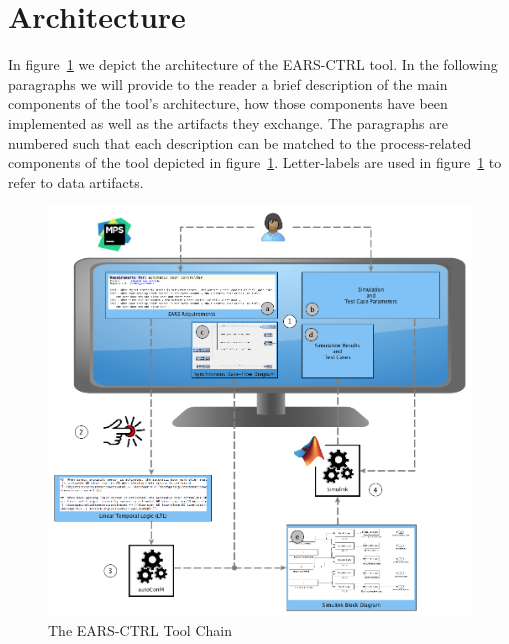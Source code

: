 \section{Architecture}
\vspace{-.3cm}In figure~\ref{fig:ears_ctrl_toolchain} we depict the architecture
of the \textsf{EARS-CTRL} tool. In the following paragraphs we will provide to the
reader a brief description of the main components of the tool's architecture, how those
components have been implemented as well as the artifacts they exchange. The
paragraphs are numbered such that each description can be matched to the 
process-related components of the tool depicted in
figure~\ref{fig:ears_ctrl_toolchain}. 
Letter-labels are used in figure~\ref{fig:ears_ctrl_toolchain} to refer to data
artifacts.\vspace{-.3cm}
\begin{figure}[h!]
   \begin{center}
     \includegraphics[width=1\textwidth]{images/toolchain.png}
     \caption{The \textsf{EARS-CTRL} Tool Chain}
     \label{fig:ears_ctrl_toolchain}
   \end{center}
 \end{figure}
\vspace{0cm}
